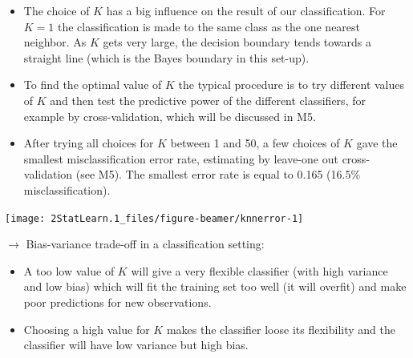 \documentclass[ignorenonframetext,]{beamer}
\begin{document}
\begin{frame}

\begin{itemize}
\item
  The choice of \(K\) has a big influence on the result of our
  classification. For \(K=1\) the classification is made to the same
  class as the one nearest neighbor. As \(K\) gets very large, the
  decision boundary tends towards a straight line (which is the Bayes
  boundary in this set-up).
\item
  To find the optimal value of \(K\) the typical procedure is to try
  different values of \(K\) and then test the predictive power of the
  different classifiers, for example by cross-validation, which will be
  discussed in M5.
\item
  After trying all choices for \(K\) between 1 and 50, a few choices of
  \(K\) gave the smallest misclassification error rate, estimating by
  leave-one out cross-validation (see M5). The smallest error rate is
  equal to 0.165 (16.5\% misclassification).
\end{itemize}

\end{frame}

\begin{frame}

\begin{center}\texttt{[image: 2StatLearn.1\_files/figure-beamer/knnerror-1]} \end{center}

\end{frame}

\begin{frame}

\(\rightarrow\) Bias-variance trade-off in a classification setting:

\begin{itemize}
\item
  A too low value of \(K\) will give a very flexible classifier (with
  high variance and low bias) which will fit the training set too well
  (it will overfit) and make poor predictions for new observations.
\item
  Choosing a high value for \(K\) makes the classifier loose its
  flexibility and the classifier will have low variance but high bias.
\end{itemize}

\end{frame}
\end{document}
